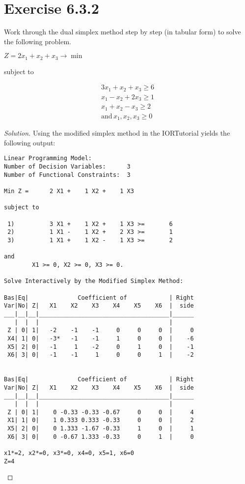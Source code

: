 \documentclass[titlepage, letterpaper, fleqn]{article}
\renewcommand\qedsymbol{\(\blacksquare\)}
\newenvironment{solution}
{\renewcommand\qedsymbol{$\square$}\begin{proof}[Solution]}
{\end{proof}}
\begin{document}
\pagebreak

\section{Exercise 6.3.2}

{\large Work through the dual simplex method step by step (in tabular form) to solve the following problem.
   
$Z = 2x_1 + x_2 + x_3 \to \min$

subject to
   
\begin{align*}
3x_1 + x_2 + x_3 \geq 6 \\
x_1 - x_2 + 2x_3 \geq 1 \\
x_1 + x_2 - x_3 \geq 2 \\
\text{and} \, x_1, x_2, x_3 \geq 0    
\end{align*}
}

\begin{solution}
Using the modified simplex method in the IORTutorial yields the following output:

\begin{lstlisting}[basicstyle=\tiny]
Linear Programming Model:
Number of Decision Variables:      3
Number of Functional Constraints:  3

Min Z =      2 X1 +    1 X2 +    1 X3 

subject to

 1)          3 X1 +    1 X2 +    1 X3 >=       6
 2)          1 X1 -    1 X2 +    2 X3 >=       1
 3)          1 X1 +    1 X2 -    1 X3 >=       2

and
        X1 >= 0, X2 >= 0, X3 >= 0.

Solve Interactively by the Modified Simplex Method:

Bas|Eq|              Coefficient of            | Right
Var|No| Z|   X1    X2    X3    X4    X5    X6  |  side
___|__|__|_____________________________________|______
   |  |  |                                     | 
 Z | 0| 1|   -2    -1    -1     0     0     0  |     0
 X4| 1| 0|   -3*   -1    -1     1     0     0  |    -6
 X5| 2| 0|   -1     1    -2     0     1     0  |    -1
 X6| 3| 0|   -1    -1     1     0     0     1  |    -2


Bas|Eq|              Coefficient of            | Right
Var|No| Z|   X1    X2    X3    X4    X5    X6  |  side
___|__|__|_____________________________________|______
   |  |  |                                     | 
 Z | 0| 1|    0 -0.33 -0.33 -0.67     0     0  |     4
 X1| 1| 0|    1 0.333 0.333 -0.33     0     0  |     2
 X5| 2| 0|    0 1.333 -1.67 -0.33     1     0  |     1
 X6| 3| 0|    0 -0.67 1.333 -0.33     0     1  |     0

x1*=2, x2*=0, x3*=0, x4=0, x5=1, x6=0
Z=4
\end{lstlisting}
\end{solution}
\end{document}
